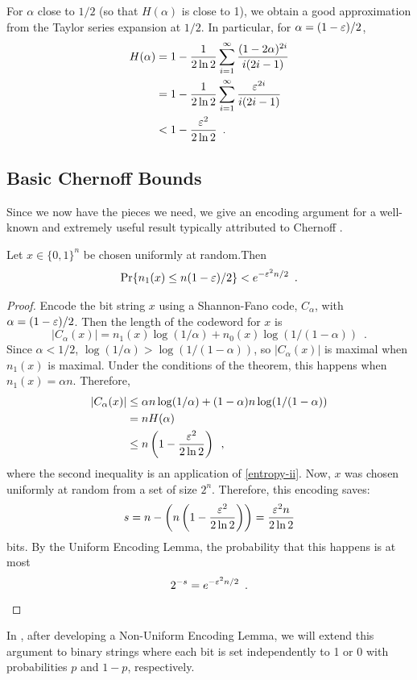 \documentclass{patmorin}
\begin{document}
For $\alpha$ close to $1/2$ (so that $H(\alpha)$ is close to 1), we
obtain a good approximation from the Taylor series expansion at
$1/2$. In particular, for $\alpha=(1-\varepsilon)/2$,
\begin{align}
  H(\alpha) & = 1-\frac{1}{2\ln 2}\sum_{i=1}^{\infty}\frac{(1-2\alpha)^{2i}}{i(2i-1)} 
              \notag \\ 
            & = 1-\frac{1}{2\ln 2}\sum_{i=1}^{\infty}\frac{\eps^{2i}}{i(2i-1)} 
              \notag \\ 
            & < 1-\frac{\eps^2}{2\ln 2} \enspace .\eqlabel{entropy-ii}
\end{align}

\subsection{Basic Chernoff Bounds}

Since we now have the pieces we need, we give an encoding argument for
a well-known and extremely useful result typically attributed to
Chernoff \cite{chernoff:bound}.

\begin{thm}
  Let $x\in\{0,1\}^n$ be chosen uniformly at random.Then
  \[
    \Pr\{n_1(x) \le n(1-\varepsilon)/2\} < e^{-\varepsilon^2n/2} \enspace .
  \]
\end{thm}

\begin{proof}
  Encode the bit string $x$ using a Shannon-Fano code, $C_\alpha$,
  with $\alpha=(1-\varepsilon)/2$.  Then the length of the codeword for $x$
  is
  \[
    |C_\alpha(x)| = n_1(x)\log(1/\alpha) + n_0(x)\log (1/(1-\alpha))
    \enspace .
  \]
  Since $\alpha < 1/2$, $\log(1/\alpha) > \log(1/(1-\alpha))$, so
  $|C_\alpha(x)|$ is maximal when $n_1(x)$ is maximal.  Under the
  conditions of the theorem, this happens when $n_1(x)=\alpha n$.
  Therefore,
  \begin{align*}
    |C_\alpha(x)| & \le \alpha n\log(1/\alpha) + (1-\alpha)n\log(1/(1-\alpha))\\
                  & = n H(\alpha) \\
                  & \le n\left(1-\frac{\varepsilon^2}{2\ln 2}\right) \enspace ,
  \end{align*}
  where the second inequality is an application of \eqref{entropy-ii}.
  Now, $x$ was chosen uniformly at random from a set of size $2^n$.
  Therefore, this encoding saves:
  \[  
    s = n-\left(n\left(1-\frac{\varepsilon^2}{2\ln 2}\right)\right) =
    \frac{\varepsilon^2n}{2\ln 2}
  \]
  bits.  By the Uniform Encoding Lemma, the probability that this
  happens is at most
  \[
    2^{-s} = e^{-\varepsilon^2n/2} \enspace . \qedhere
  \]
\end{proof}
In , after developing a Non-Uniform Encoding Lemma,
we will extend this argument to binary strings where each bit is set
independently to 1 or 0 with probabilities $p$ and $1-p$,
respectively.
\end{document}

